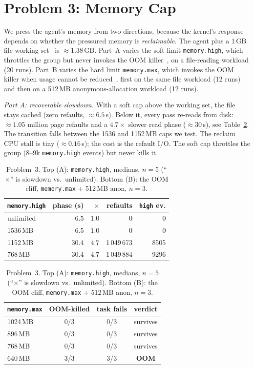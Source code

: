 \documentclass[10pt,conference]{IEEEtran}
\newcommand{\uu}[1]{\,\textsf{#1}}
\begin{document}
\section{Problem 3: Memory Cap}
\label{sec:mem}

We press the agent's memory from two directions, because the kernel's
response depends on whether the pressured memory is \emph{reclaimable}. The
agent plus a 1\,GB file working set~\cite{denning1968} is
${\approx}1.38$\,GB. Part~A varies the soft limit \texttt{memory.high},
which throttles the group but never invokes the OOM killer~\cite{cgroupv2},
on a file-reading workload (20 runs). Part~B varies the hard limit
\texttt{memory.max}, which invokes the OOM killer when usage cannot be
reduced~\cite{cgroupv2}, first on the same file workload (12 runs) and then
on a 512\,MB anonymous-allocation workload (12 runs).

\emph{Part A: recoverable slowdown.} With a soft cap above the working set,
the file stays cached (zero refaults, ${\approx}6.5$\uu{s}). Below it, every
pass re-reads from disk: ${\approx}1.05$ million page refaults and a
$4.7\times$ slower read phase (${\approx}30$\uu{s}), see
Table~\ref{tab:mem}. The transition falls between the 1536 and 1152\,MB
caps we test. The reclaim CPU stall is tiny (${\approx}0.16$\uu{s}); the
cost is the refault I/O. The soft cap throttles the group (8--9k
\texttt{memory.high} events) but never kills it.

\begin{table}[t]\centering\footnotesize
\setlength{\tabcolsep}{4pt}
\caption{Problem~3. Top (A): \texttt{memory.high}, medians, $n{=}5$
(``$\times$'' is slowdown vs.\ unlimited). Bottom (B): the OOM cliff,
\texttt{memory.max} + 512\,MB anon, $n{=}3$.}
\label{tab:mem}
\begin{tabular}{@{}lrrrr@{}}
\toprule
\texttt{memory.high} & phase (s) & $\times$ & refaults & \texttt{high} ev.\\
\midrule
unlimited & 6.5  & $1.0$ & 0            & 0 \\
1536\,MB  & 6.5  & $1.0$ & 0            & 0 \\
1152\,MB  & 30.4 & $4.7$ & 1\,049\,673  & 8505 \\
768\,MB   & 30.4 & $4.7$ & 1\,049\,884  & 9296 \\
\bottomrule
\end{tabular}

\medskip

\begin{tabular}{@{}lccc@{}}
\toprule
\texttt{memory.max} & OOM-killed & task fails & verdict\\
\midrule
1024\,MB & 0/3 & 0/3 & survives \\
896\,MB  & 0/3 & 0/3 & survives \\
768\,MB  & 0/3 & 0/3 & survives \\
640\,MB  & 3/3 & 3/3 & \textbf{OOM} \\
\bottomrule
\end{tabular}
\end{table}
\end{document}
